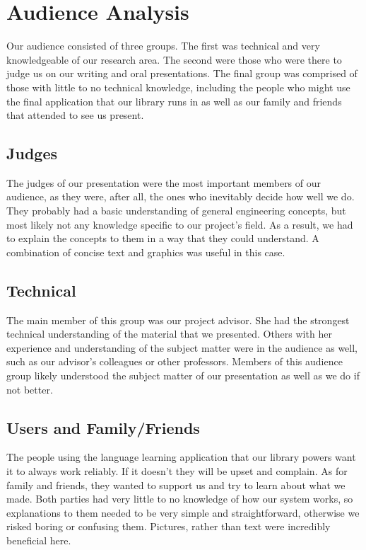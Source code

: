 \chapter{Audience Analysis}

Our audience consisted of three groups. The first was technical and very knowledgeable of our research area. The second were those who were there to judge us on our writing and oral presentations. The final group was comprised of those with little to no technical knowledge, including the people who might use the final application that our library runs in as well as our family and friends that attended to see us present.

\section{Judges}
The judges of our presentation were the most important members of our audience, as they were, after all, the ones who inevitably decide how well we do. They probably had a basic understanding of general engineering concepts, but most likely not any knowledge specific to our project's field. As a result, we had to explain the concepts to them in a way that they could understand. A combination of concise text and graphics was useful in this case.


\section{Technical}
The main member of this group was our project advisor. She had the strongest technical understanding of the material that we presented. Others with her experience and understanding of the subject matter were in the audience as well, such as our advisor's colleagues or other professors. Members of this audience group likely understood the subject matter of our presentation as well as we do if not better.


\section{Users and Family/Friends}
The people using the language learning application that our library powers want it to always work reliably. If it doesn't they will be upset and complain. As for family and friends, they wanted to support us and try to learn about what we made. Both parties had very little to no knowledge of how our system works, so explanations to them needed to be very simple and straightforward, otherwise we risked boring or confusing them. Pictures, rather than text were incredibly beneficial here.

